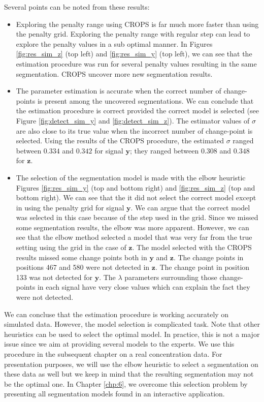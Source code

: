 Several points can be noted from these results:
\begin{itemize}
\item Exploring the penalty range using CROPS is far much more faster than using the penalty grid. Exploring the penalty range with regular step can lead to explore the penalty values in a sub optimal manner. In Figures \ref{fig:res_sim_z} (top left) and \ref{fig:res_sim_y} (top left), we can see that the estimation procedure was run for several penalty values resulting in the same segmentation. CROPS uncover more new segmentation results.
\item The parameter estimation is accurate when the correct number of change-points is present among the uncovered segmentations. We can conclude that the estimation procedure is correct provided the correct model is selected (see Figure \ref{fig:detect_sim_y} and \ref{fig:detect_sim_z}). The estimator values of $\sigma$ are also close to its true value when the incorrect number of change-point is selected. Using the results of the CROPS procedure, the estimated $\sigma$ ranged between $0.334$ and $0.342$ for signal $\bm y$; they ranged between $0.308$ and $ 0.348$ for $\bm z$. 
\item The selection of the segmentation model is made with the elbow heuristic Figures \ref{fig:res_sim_y} (top and bottom right) and \ref{fig:res_sim_z} (top and bottom right). We can see that the it did not select the correct model except in using the penalty grid for signal $\bm y$. We can argue that the correct model was selected in this case because of the step used in the grid. Since we missed some segmentation results, the elbow was more apparent. However, we can see that the elbow method selected a model that was very far from the true setting using the grid in the case of $\bm z$. The model selected with the CROPS results missed some change points both in $\bm y$ and $\bm z$. The change points in positions 467 and 580 were not detected in $\bm z$. The change point in position 133 was not detected for $\bm y$. The $\lambda$ parameters surrounding those change-points  in each signal have very close values which can explain the fact they were not detected.     
\end{itemize}

We can concluse that the estimation procedure is working accurately on simulated data. However, the model selection is complicated task. Note that other heuristics can be used to select the optimal model. In practice, this is not a major issue since we aim at providing several models to the experts. We use this procedure in the subsequent chapter on a real concentration data. For presentation purposes, we will use the elbow heuristic to select a segmentation on these data as well but we keep in mind that the resulting segmentation may not be the optimal one. In Chapter \ref{chp:6}, we overcome this selection problem by presenting all segmentation models found in an interactive application. 


